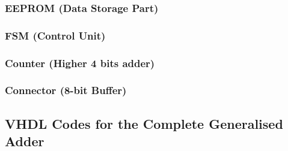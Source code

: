 \documentclass[11pt]{article}
\begin{document}
\begin{appendix}
\subsubsection{EEPROM (Data Storage Part)}


\subsubsection{FSM (Control Unit)}


\subsubsection{Counter (Higher 4 bits adder)}


\subsubsection{Connector (8-bit Buffer)}


\subsection{VHDL Codes for the Complete Generalised Adder}
\label{app:c3}


\end{appendix}
\end{document}
